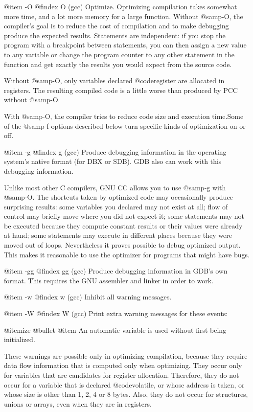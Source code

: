 {@item -O
@findex O (gcc)
Optimize. Optimizing compilation takes somewhat more time, and a lot
more memory for a large function.
Without @samp{-O}, the compiler's goal is to reduce the cost of
compilation and to make debugging produce the expected results.
Statements are independent: if you stop the program with a breakpoint
between statements, you can then assign a new value to any variable or
change the program counter to any other statement in the function and
get exactly the results you would expect from the source code.

Without @samp{-O}, only variables declared @code{register} are
allocated in registers. The resulting compiled code is a little worse
than produced by PCC without @samp{-O}.

With @samp{-O}, the compiler tries to reduce code size and execution
time.Some of the @samp{-f} options described below turn specific kinds of
optimization on or off.

@item -g
@findex g (gcc)
Produce debugging information in the operating system's native format
(for DBX or SDB).  GDB also can work with this debugging information.

Unlike most other C compilers, GNU CC allows you to use @samp{-g} with
@samp{-O}. The shortcuts taken by optimized code may occasionally
produce surprising results: some variables you declared may not exist
at all; flow of control may briefly move where you did not expect it;
some statements may not be executed because they compute constant
results or their values were already at hand; some statements may
execute in different places because they were moved out of loops.
Nevertheless it proves possible to debug optimized output. This makes
it reasonable to use the optimizer for programs that might have bugs.

@item -gg
@findex gg (gcc)
Produce debugging information in GDB's own format. This requires the
GNU assembler and linker in order to work.

@item -w
@findex w (gcc)
Inhibit all warning messages.

@item -W
@findex W (gcc)
Print extra warning messages for these events:

@itemize @bullet
@item
An automatic variable is used without first being initialized.

These warnings are possible only in optimizing compilation,
because they require data flow information that is computed only
when optimizing.  They occur only for variables that are
candidates for register allocation.  Therefore, they do not occur
for a variable that is declared @code{volatile}, or whose address
is taken, or whose size is other than 1, 2, 4 or 8 bytes.  Also,
they do not occur for structures, unions or arrays, even when
they are in registers.

}
